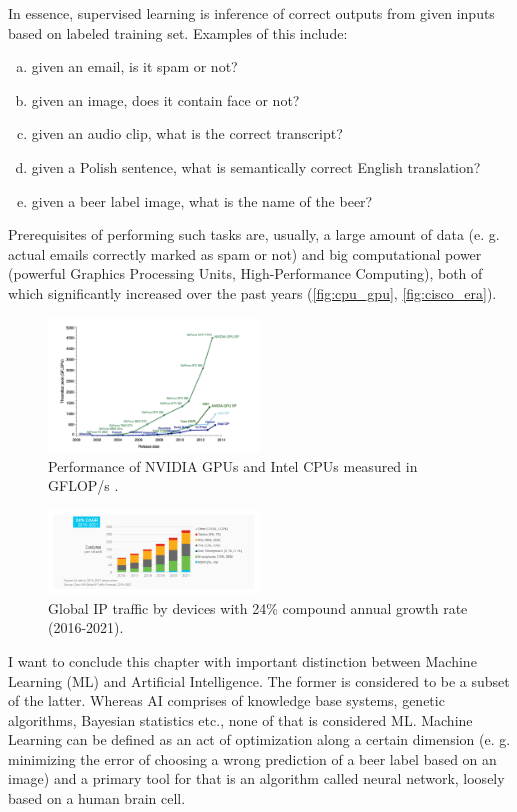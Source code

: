 \documentclass[11pt]{article}
\begin{document}
In essence, supervised learning is inference of correct outputs from given inputs based on labeled training set. Examples of this include:
\begin{enumerate}[a)]
\item given an email, is it spam or not?
\item given an image, does it contain face or not?
\item given an audio clip, what is the correct transcript?
\item given a Polish sentence, what is semantically correct English translation?
\item given a beer label image, what is the name of the beer?
\end{enumerate}
Prerequisites of performing such tasks are, usually, a large amount of data (e. g. actual emails correctly marked as spam or not) and big computational power (powerful Graphics Processing Units, High-Performance Computing), both of which significantly increased over the past years (\autoref{fig:cpu_gpu}, \autoref{fig:cisco_era}).\\

\begin{figure}[h]
\includegraphics[width=0.5\textwidth]{cpu_gpu}
\centering
\caption{Performance of NVIDIA GPUs and Intel CPUs measured in GFLOP/s \cite{cpu_vs_gpu}.}
\label{fig:cpu_gpu}
\end{figure}

\begin{figure}[h]
\includegraphics[width=0.5\textwidth]{cisco_era}
\centering
\caption{Global IP traffic by devices \cite{cisco_era} with 24\% compound annual growth rate (2016-2021).}
\label{fig:cisco_era}
\end{figure}

I want to conclude this chapter with important distinction between Machine Learning (ML) and Artificial Intelligence. The former is considered to be a subset of the latter. Whereas AI comprises of knowledge base systems, genetic algorithms, Bayesian statistics etc., none of that is considered ML. Machine Learning can be defined as an act of optimization along a certain dimension (e. g. minimizing the error of choosing a wrong prediction of a beer label based on an image) and a primary tool for that is an algorithm called neural network, loosely based on a human brain cell.
\clearpage
\end{document}
